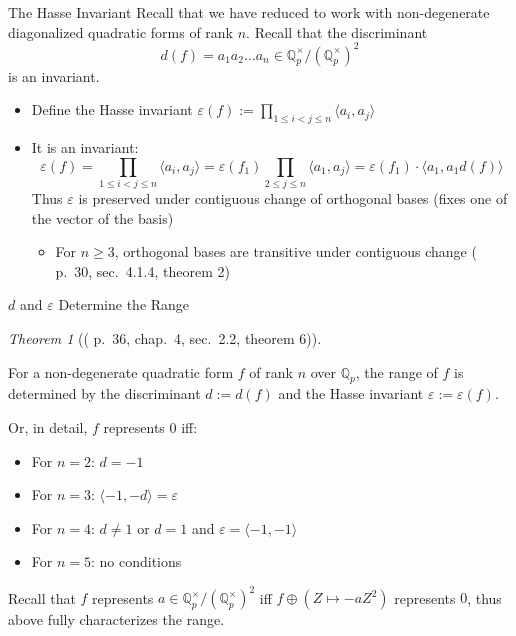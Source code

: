 \documentclass[fontset=fandol,envcountsect]{ctexbeamer}
\providecommand{\tightlist}{%
  \setlength{\itemsep}{0pt}\setlength{\parskip}{0pt}}\usepackage{longtable,booktabs,array}
\theoremstyle{theorem}
\newtheorem{theorem}{定理}
\theoremstyle{example}
\theoremstyle{remark}
\theoremstyle{theorem}
\newtheorem{theorem}{Theorem}
\theoremstyle{example}
\theoremstyle{remark}
\newcommand{\myemph}[1]{{\usebeamercolor[fg]{structure} #1}}
\renewcommand{\emph}{\myemph}
\begin{document}
\begin{frame}{The Hasse Invariant}
\label{the-hasse-invariant}
Recall that we have reduced to work with non-degenerate diagonalized
quadratic forms of rank \(n\). Recall that the discriminant \[
d(f) = a_1 a_2 \dots a_n \in \mathbb Q_p^\times / (\mathbb Q_p^\times)^2
\] is an invariant.

\begin{itemize}
\item
  Define the \emph{Hasse invariant}
  \(\varepsilon(f) := \prod_{1 \leq i < j \leq n} \langle a_i, a_j \rangle\)
\item
  It is an invariant: \[
  \varepsilon(f) = \prod_{1 \leq i < j \leq n} \langle a_i, a_j \rangle = \varepsilon(f_1) \prod_{2 \leq j \leq n} \langle a_1, a_j \rangle = \varepsilon(f_1) \cdot \langle a_1, a_1 d(f) \rangle
  \] Thus \(\varepsilon\) is preserved under \emph{contiguous} change of
  orthogonal bases (fixes one of the vector of the basis)

  \begin{itemize}
  \tightlist
  \item
    For \(n \geq 3\), orthogonal bases are transitive under contiguous
    change (\autocite{serre_course_1973} p.~30, sec.~4.1.4, theorem 2)
  \end{itemize}
\end{itemize}
\end{frame}

\begin{frame}{\(d\) and \(\varepsilon\) Determine the Range}
\label{d-and-varepsilon-determine-the-range}
\begin{theorem}[(\autocite{serre_course_1973} p.~36, chap.~4, sec.~2.2,
theorem
6)]\protect\hypertarget{thm-qp-range-determine}{}\label{thm-qp-range-determine}

For a non-degenerate quadratic form \(f\) of rank \(n\) over
\(\mathbb Q_p\), the range of \(f\) is determined by the discriminant
\(d := d(f)\) and the Hasse invariant \(\varepsilon := \varepsilon(f)\).

Or, in detail, \(f\) represents \(0\) iff:

\begin{itemize}
\tightlist
\item
  For \(n=2\): \(d=-1\)
\item
  For \(n=3\): \(\langle -1,-d \rangle = \varepsilon\)
\item
  For \(n=4\): \(d \neq 1\) or \(d=1\) and
  \(\varepsilon = \langle -1,-1 \rangle\)
\item
  For \(n=5\): no conditions
\end{itemize}

\end{theorem}

Recall that \(f\) represents
\(a \in \mathbb Q_p^\times / (\mathbb Q_p^\times)^2\) iff
\(f \oplus (Z \mapsto -a Z^2)\) represents \(0\), thus above fully
characterizes the range.
\end{frame}
\end{document}
